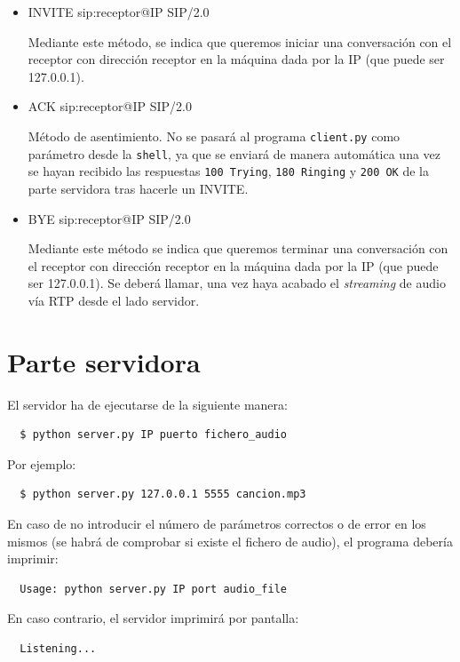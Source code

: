 \documentclass[a4paper,11pt]{article}
\begin{document}
  \begin{itemize}
    \item INVITE sip:receptor@IP SIP/2.0

    Mediante este método, se indica que queremos iniciar una conversación con el receptor con dirección receptor en la máquina dada por la IP (que puede ser 127.0.0.1).


    \item ACK sip:receptor@IP SIP/2.0

    Método de asentimiento. No se pasará al programa \texttt{client.py} como parámetro desde
la \texttt{shell}, ya que se enviará de manera automática una vez se hayan recibido las respuestas \texttt {100 Trying}, \texttt{180 Ringing} y \texttt{200 OK} de la parte servidora tras hacerle un INVITE.

    \item BYE sip:receptor@IP SIP/2.0

    Mediante este método se indica que queremos terminar una conversación con el receptor con dirección receptor en la máquina dada por la IP (que puede ser 127.0.0.1). Se deberá llamar, una vez haya acabado el \emph{streaming} de audio vía RTP desde el lado servidor.

  \end{itemize}


\section*{Parte servidora}

El servidor ha de ejecutarse de la siguiente manera:
\begin{verbatim}
  $ python server.py IP puerto fichero_audio
\end{verbatim}

Por ejemplo:
\begin{verbatim}
  $ python server.py 127.0.0.1 5555 cancion.mp3
\end{verbatim}

En caso de no introducir el número de parámetros correctos o de error en los mismos (se habrá de comprobar si existe el fichero de audio), el programa debería imprimir:
\begin{verbatim}
  Usage: python server.py IP port audio_file
\end{verbatim}

En caso contrario, el servidor imprimirá por pantalla:
\begin{verbatim}
  Listening...
\end{verbatim}
\end{document}
